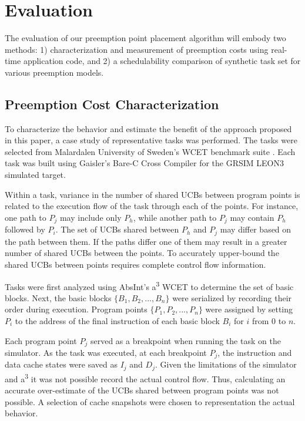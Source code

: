 \section{Evaluation}\label{sec:evaluation}

The evaluation of our preemption point placement algorithm will embody
two methods: 1) characterization and measurement of preemption costs
using real-time application code, and 2) a schedulability comparison
of synthetic task set for various preemption models. 

\subsection {Preemption Cost
  Characterization}\label{sec:preemption_cost_measurement} 
To characterize the behavior and estimate the benefit of the approach
proposed in this paper, a case study of representative tasks was
performed. The tasks were selected from Malardalen University of
Sweden's WCET benchmark suite \cite{mrtc:01}. Each task was built using Gaisler's
Bare-C Cross Compiler \cite{gaisler:01} for the GRSIM
LEON3 \cite{gaisler:02} simulated target. 

Within a task, variance in the number of shared UCBs between program
points is related to the execution flow of the task through each of
the points. For instance, one path to ${P_j}$ may include only ${P_h}$,
while another path to ${P_j}$ may contain ${P_h}$ followed by
${P_i}$. The set of UCBs shared between ${P_h}$ and ${P_j}$ may differ
based on the path between them. If the paths differ one of them may
result in a greater number of shared UCBs between the points. To
accurately upper-bound the shared UCBs between points requires
complete control flow information.

Tasks were first analyzed using AbsInt's a\textsuperscript{3} WCET
\cite{absint:01} to determine the set of basic blocks. Next, the basic
blocks ${\{B_1, B_2, ..., B_n\}}$ were serialized by recording their
order during execution. Program points ${\{P_1, P_2, ..., P_n\}}$ were
assigned by setting ${P_i}$ to the address of the final instruction of
each basic block ${B_i}$ for ${i}$ from ${0}$ to ${n}$.

Each program point ${P_j}$ served as a breakpoint when running the
task on the simulator. As the task was executed, at each breakpoint
${P_j}$, the instruction and data cache states were saved as ${I_j}$
and ${D_j}$. Given the limitations of the simulator and
a\textsuperscript{3} it was not possible record the actual control
flow. Thus, calculating an accurate over-estimate of the UCBs shared
between program points was not possible. A selection of cache
snapshots were chosen to representation the actual behavior.

